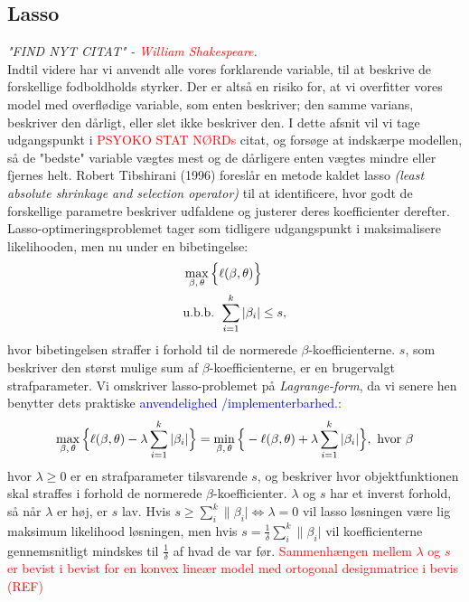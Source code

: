 \documentclass[11pt,a4paper]{article}
\begin{document}
\subsection{Lasso}
\textit{"FIND NYT CITAT" - \textcolor{red}{William Shakespeare}.}\\
Indtil videre har vi anvendt alle vores forklarende variable, til at beskrive de forskellige fodboldholds styrker. Der er altså en risiko for, at vi overfitter vores model med overflødige variable, som enten beskriver; den samme varians, beskriver den dårligt, eller slet ikke beskriver den. I dette afsnit vil vi tage udgangspunkt i \textcolor{red}{PSYOKO STAT NØRDs} citat, og forsøge at indskærpe modellen, så de "bedste" variable vægtes mest og de dårligere enten vægtes mindre eller fjernes helt. Robert Tibshirani (1996)\cite{RobertTibshirani} foreslår en metode kaldet lasso \textit{(least absolute shrinkage and selection operator)} til at identificere, hvor godt de forskellige parametre beskriver udfaldene og justerer deres koefficienter derefter. Lasso-optimeringsproblemet tager som tidligere udgangspunkt i maksimalisere likelihooden, men nu under en bibetingelse:
\begin{align*}
&\max_{\beta,\,\theta} \Big{\{}\ell(\beta,\theta)\Big{\}} \\
&\text{u.b.b. }\sum_{i=1}^k|\beta_i|\leq s,
\end{align*}
hvor bibetingelsen straffer i forhold til de normerede $\beta$-koefficienterne. $s$, som beskriver den størst mulige sum af $\beta$-koefficienterne, er en brugervalgt strafparameter. 
Vi omskriver lasso-problemet på \textit{Lagrange-form}, da vi senere hen benytter dets praktiske \textcolor{blue}{anvendelighed /implementerbarhed.}:
\begin{align*}
\max_{\beta,\,\theta} \Big{\{}\ell(\beta,\theta)-\lambda\sum_{i=1}^k|\beta_i|\Big{\}}=\min_{\beta,\,\theta} \Big{\{}-\ell(\beta,\theta)+\lambda\sum_{i=1}^k|\beta_i|\Big{\}},\text{ hvor }\beta
\end{align*}
hvor $\lambda\geq0$ er en strafparameter tilsvarende $s$, og beskriver hvor objektfunktionen skal straffes i forhold de normerede $\beta$-koefficienter. $\lambda$ og $s$ har et inverst forhold, så når $\lambda$ er høj, er $s$ lav. Hvis $s\geq\sum_i^k\|\beta_i|\iff \lambda=0$ vil lasso løsningen være lig maksimum likelihood løsningen, men hvis $s=\frac{1}{\delta}\sum_i^k\|\beta_i|$ vil koefficienterne gennemsnitligt mindskes til $\frac{1}{\delta}$ af hvad de var før. \textcolor{red}{Sammenhængen mellem $\lambda$ og $s$ er bevist i bevist for en konvex lineær model med ortogonal designmatrice i bevis (REF)}
\end{document}
